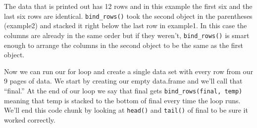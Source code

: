 \documentclass[
]{krantz}
\begin{document}
The data that is printed out has 12 rows and in this example the first six and the last six rows are identical. \texttt{bind\_rows()} took the second object in the parentheses (example2) and stacked it right below the last row in example1. In this case the columns are already in the same order but if they weren't, \texttt{bind\_rows()} is smart enough to arrange the columns in the second object to be the same as the first object.

Now we can run our for loop and create a single data set with every row from our 9 pages of data. We start by creating our empty data.frame and we'll call that ``final.'' At the end of our loop we say that final gets \texttt{bind\_rows(final,\ temp)} meaning that temp is stacked to the bottom of final every time the loop runs. We'll end this code chunk by looking at \texttt{head()} and \texttt{tail()} of final to be sure it worked correctly.
\end{document}
